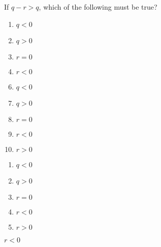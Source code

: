 If $q-r>q$, which of the following must be true?


\ifsat
	\begin{enumerate}[label=\Alph*)]
		\item $q<0$
		\item $q>0$
		\item $r=0$
		\item $r<0$%
	\end{enumerate}
\else
\fi

\ifacteven
	\begin{enumerate}[label=\textbf{\Alph*.},itemsep=\fill,align=left]
		\setcounter{enumii}{5}
		\item $q<0$
		\item $q>0$
		\item $r=0$
		\addtocounter{enumii}{1}
		\item $r<0$%
		\item $r>0$
	\end{enumerate}
\else
\fi

\ifactodd
	\begin{enumerate}[label=\textbf{\Alph*.},itemsep=\fill,align=left]
		\item $q<0$
		\item $q>0$
		\item $r=0$
		\item $r<0$%
		\item $r>0$
	\end{enumerate}
\else
\fi

\ifgridin
 $r<0$%

\else
\fi


